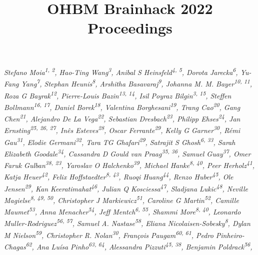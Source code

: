 \documentclass[10pt,a4paper,twocolumns]{proc}
\title{OHBM Brainhack 2022 Proceedings}
\newcommand{\authors}[1]{\emph{\footnotesize #1} \\}
\begin{document}
\maketitle

\authors{Stefano Moia\textsuperscript{1, 2}, %
Hao-Ting Wang\textsuperscript{3}, %
Anibal S Heinsfeld\textsuperscript{4, 5}, %
Dorota Jarecka\textsuperscript{6}, %
Yu-Fang Yang\textsuperscript{7}, %
Stephan Heunis\textsuperscript{8}, %
Arshitha Basavaraj\textsuperscript{9}, %
Johanna M. M.  Bayer\textsuperscript{10, 11}, %
Roza G Bayrak\textsuperscript{12}, %
Pierre-Louis Bazin\textsuperscript{13, 14}, %
Isil Poyraz Bilgin\textsuperscript{3, 15}, %
Steffen Bollmann\textsuperscript{16, 17}, %
Daniel Borek\textsuperscript{18}, %
Valentina Borghesani\textsuperscript{19}, %
Trang Cao\textsuperscript{20}, %
Gang Chen\textsuperscript{21}, %
Alejandro De La Vega\textsuperscript{22}, %
Sebastian Dresbach\textsuperscript{23}, %
Philipp Ehses\textsuperscript{24}, %
Jan Ernsting\textsuperscript{25, 26, 27}, %
Inês Esteves\textsuperscript{28}, %
Oscar Ferrante\textsuperscript{29}, %
Kelly G Garner\textsuperscript{30}, %
Rémi Gau\textsuperscript{31}, %
Elodie  Germani\textsuperscript{32}, %
Tara TG Ghafari\textsuperscript{29}, %
Satrajit S Ghosh\textsuperscript{6, 33}, %
Sarah Elizabeth Goodale\textsuperscript{34}, %
Cassandra D Gould van Praag\textsuperscript{35, 36}, %
Samuel Guay\textsuperscript{37}, %
Omer Faruk Gulban\textsuperscript{38, 23}, %
Yaroslav O  Halchenko\textsuperscript{39}, %
Michael Hanke\textsuperscript{8, 40}, %
Peer Herholz\textsuperscript{41}, %
Katja Heuer\textsuperscript{42}, %
Felix Hoffstaedter\textsuperscript{8, 43}, %
Ruoqi Huang\textsuperscript{44}, %
Renzo Huber\textsuperscript{45}, %
Ole Jensen\textsuperscript{29}, %
Kan Keeratimahat\textsuperscript{46}, %
Julian Q Kosciessa\textsuperscript{47}, %
Sladjana Lukic\textsuperscript{48}, %
Neville Magielse\textsuperscript{8, 49, 50}, %
Christopher J Markiewicz\textsuperscript{51}, %
Caroline G Martin\textsuperscript{52}, %
Camille Maumet\textsuperscript{53}, %
Anna Menacher\textsuperscript{54}, %
Jeff Mentch\textsuperscript{6, 55}, %
Shammi More\textsuperscript{8, 40}, %
Leonardo Muller-Rodriguez\textsuperscript{56, 57}, %
Samuel A. Nastase\textsuperscript{58}, %
Eliana Nicolaisen-Sobesky\textsuperscript{8}, %
Dylan M Nielson\textsuperscript{59}, %
Christopher R. Nolan\textsuperscript{30}, %
François Paugam\textsuperscript{60, 61}, %
Pedro Pinheiro-Chagas\textsuperscript{62}, %
Ana Luísa Pinho\textsuperscript{63, 64}, %
Alessandra Pizzuti\textsuperscript{45, 38}, %
Benjamin Poldrack\textsuperscript{56}, %
}
\end{document}
